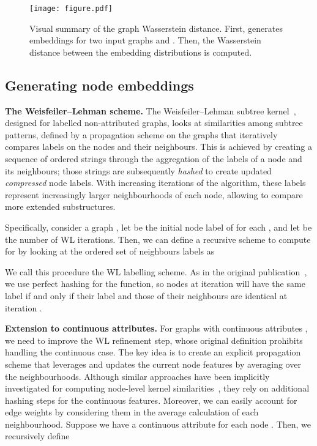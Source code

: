 \documentclass{article}
\begin{document}
\begin{figure*}[t]
\vskip 0.2in
  \centering
  \texttt{[image: figure.pdf]}
\caption{Visual summary of the graph Wasserstein distance. First,  generates embeddings for two input graphs  and . Then, the Wasserstein distance between the embedding distributions is computed.}
\label{fig:scheme}
\vskip -0.2in
\end{figure*}

\subsection{Generating node embeddings} \label{sec:NodeEmbeddings}


\textbf{The Weisfeiler--Lehman scheme.} The Weisfeiler--Lehman subtree kernel~\citep{shervashidze2009FastSK, shervashidze2011weisfeiler}, designed for labelled non-attributed graphs, looks at similarities among subtree patterns, defined by a propagation scheme on the graphs that iteratively compares labels on the nodes and their neighbours. This is achieved by creating a sequence of ordered strings through the aggregation of the labels of a node and its neighbours; those strings are subsequently \textit{hashed} to create updated \textit{compressed} node labels.
With increasing iterations of the algorithm, these labels represent increasingly larger neighbourhoods of each node, allowing to compare more extended substructures. 

Specifically, consider a graph , let  be the initial node label of  for each , and let  be the number of WL iterations. Then, we can define a recursive scheme to compute  for  by looking at the ordered set of neighbours labels  as 


We call this procedure the WL labelling scheme. As in the original publication~\citep{shervashidze2009FastSK}, we use perfect hashing for the  function, so nodes at iteration  will have the same label if and only if their label and those of their neighbours are identical at iteration . 

\textbf{Extension to continuous attributes.} For graphs with continuous attributes , we need to improve the WL refinement step, whose original definition prohibits handling the continuous case. The key idea is to create an explicit propagation scheme that leverages and updates the current node features by averaging over the neighbourhoods.
Although similar approaches have been implicitly investigated for computing node-level kernel similarities~\citep{neumann2016, morris2016faster}, they rely on additional hashing steps for the continuous features. 
Moreover, we can easily account for edge weights by considering them in the average calculation of each neighbourhood.
Suppose we have a continuous attribute  for each node . Then, we recursively define
\end{document}
